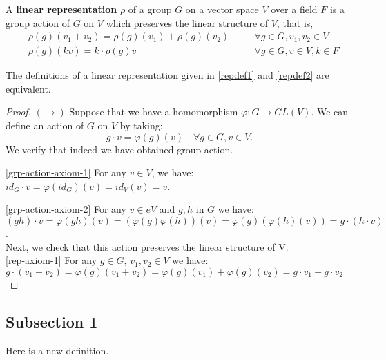 
\begin{defn}\label{repdef2}A \textbf{linear representation} $\rho$ of a group $G$ on a vector space $V$ over a field $F$ is a group action of $G$ on $V$ which preserves the linear structure of $V$, that is, 
\begin{align}
\label{rep-axiom-1}&\rho(g)(v_1+v_2)=\rho(g)(v_1)+\rho(g)(v_2) \quad && \forall g \in G, v_1, v_2 \in V \\
\label{rep-axiom-2}&\rho(g)(kv) = k \cdot \rho(g)v \quad && \forall g \in G, v \in V, k \in F
\end{align}
 \end{defn}
 
 \begin{prop}
The definitions of a linear representation given in \ref{repdef1} and \ref{repdef2} are equivalent.
 \end{prop}
 \begin{proof}
 $(\rightarrow)$  Suppose that we have a homomorphism $\varphi : G \to GL(V)$.  We can define an action of $G$ on $V$ by taking: \[g \cdot v = \varphi(g)(v) \quad \forall g \in G, v \in V.\]
We verify that indeed we have obtained group action.

\ref{grp-action-axiom-1} For any $v \in V$, we have: $ id_G \cdot v = \varphi(id_G) (v)= id_V (v) = v$. 

\ref{grp-action-axiom-2} For any $v \in eV$ and $g,h$ in $G$ we have: $(gh) \cdot v = \varphi(gh) (v) = (\varphi(g) \varphi(h)) (v)= \varphi(g) (\varphi(h) (v))= g \cdot (h \cdot v)$.\\
Next, we check that this action preserves the linear structure of V.\\
\ref{rep-axiom-1} For any $g \in G$, $v_1, v_2 \in V$ we have: $g \cdot (v_1 +  v_2) = \varphi(g) (v_1 + v_2) = \varphi(g)(v_1) + \varphi(g)(v_2)= g \cdot v_1 + g \cdot v_2$


 \end{proof}

\subsection{Subsection 1}

\begin{defn}Here is a new definition.\end{defn}

